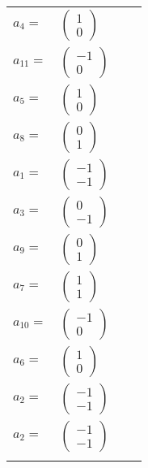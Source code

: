 \documentclass[1p]{elsarticle_modified}
\theoremstyle{definition}
\begin{document}
\begin{tabular}{m{7pt} m{180pt} m{7pt} m{180pt} }
\flushright $a_{4}=$&$\begin{pmatrix}1\\0\end{pmatrix}$ \\
\flushright $a_{11}=$&$\begin{pmatrix}-1\\0\end{pmatrix}$ \\
\flushright $a_{5}=$&$\begin{pmatrix}1\\0\end{pmatrix}$ \\
\flushright $a_{8}=$&$\begin{pmatrix}0\\1\end{pmatrix}$ \\
\flushright $a_{1}=$&$\begin{pmatrix}-1\\-1\end{pmatrix}$ \\
\flushright $a_{3}=$&$\begin{pmatrix}0\\-1\end{pmatrix}$ \\
\flushright $a_{9}=$&$\begin{pmatrix}0\\1\end{pmatrix}$ \\
\flushright $a_{7}=$&$\begin{pmatrix}1\\1\end{pmatrix}$ \\
\flushright $a_{10}=$&$\begin{pmatrix}-1\\0\end{pmatrix}$ \\
\flushright $a_{6}=$&$\begin{pmatrix}1\\0\end{pmatrix}$ \\
\flushright $a_{2}=$&$\begin{pmatrix}-1\\-1\end{pmatrix}$\\ \flushright $a_{2}=$&$\begin{pmatrix}-1\\-1\end{pmatrix}$\\&\end{tabular}
\end{document}
